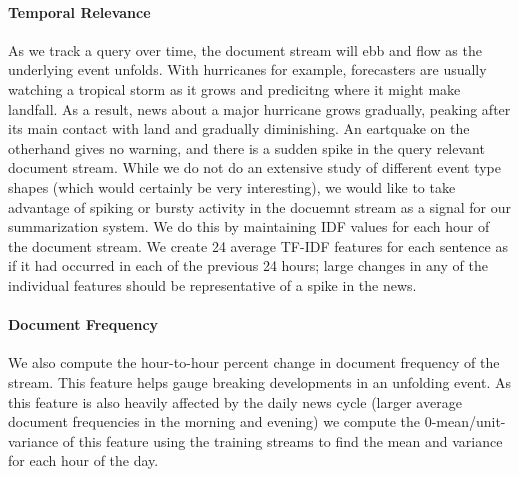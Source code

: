 

\paragraph{Temporal Relevance} As we track a query over time, the document
stream will ebb and flow as the underlying event unfolds. With hurricanes
for example, forecasters are usually watching a tropical storm as it grows
and predicitng where it might make landfall. As a result, news about a major
hurricane grows gradually, peaking after its main contact with land
and gradually diminishing. An eartquake on the otherhand gives no warning,
and there is a sudden spike in the query relevant document stream.
While we do not
do an extensive study of different event type shapes (which would certainly 
be very interesting), we would like to take advantage of spiking or bursty
activity in the docuemnt stream as a signal for our summarization system.
We do this by maintaining IDF values for each hour of the document stream.
We create 24 average TF-IDF features for each sentence as if it had occurred
in each of the previous 24 hours; large changes in any of the individual
features should be representative of a spike in the news.

\paragraph{Document Frequency} We also compute the hour-to-hour
percent change in document frequency of the stream. This
feature helps gauge breaking developments in an unfolding
event. As this feature is also heavily affected by the daily
news cycle (larger average document frequencies in the morning
and evening) we compute the 0-mean/unit-variance of this
feature using the training streams to find the mean and variance
for each hour of the day.



